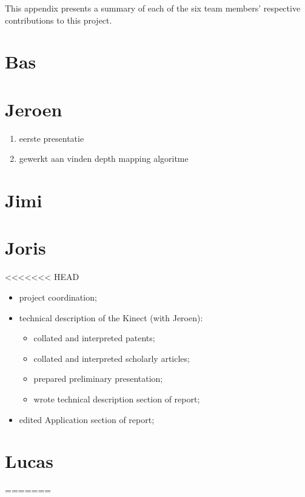 This appendix presents a summary of each of the six team members' respective
contributions to this project.


\section*{Bas}


\section*{Jeroen}
\begin{enumerate}
\item eerste presentatie
\item gewerkt aan vinden depth mapping algoritme
\end{enumerate}

\section*{Jimi}


\section*{Joris}


<<<<<<< HEAD
\begin{itemize}
    \item project coordination;
    \item technical description of the Kinect (with Jeroen):
    \begin{itemize}
        \item collated and interpreted patents;
        \item collated and interpreted scholarly articles;
        \item prepared preliminary presentation;
        \item wrote technical description section of report;
    \end{itemize}
    \item edited Application section of report;
\end{itemize}


\section{Lucas}
=======
